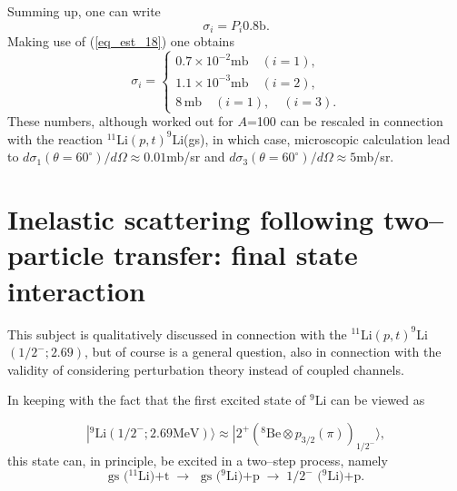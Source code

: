 \documentclass[a4paper,14pt]{article}
\begin{document}
Summing up, one can write
\begin{equation}\label{eq_est_23}
\sigma_i=P_i0.8\text{b}.
\end{equation}
Making use of (\ref{eq_est_18}) one obtains
\begin{equation}\label{eq_est_24}
\sigma_i=\left\{
\begin{array}{l}
  0.7\times 10^{-2} \text{mb}\quad (i=1), \\
   1.1\times 10^{-3} \text{mb}\quad (i=2), \\
    8 \,\text{mb}\quad (i=1),\quad (i=3).
\end{array}
\right.
\end{equation}
These numbers, although worked out for $A$=100 can be rescaled in connection with the reaction $^{11}$Li$(p,t)^9$Li(gs), in which case, microscopic calculation lead to $d\sigma_1(\theta=60^\circ)/d\Omega\approx 0.01$mb/sr and $d\sigma_3(\theta=60^\circ)/d\Omega\approx 5$mb/sr.

\section{Inelastic scattering following two--particle transfer: final state interaction}
This subject is qualitatively discussed in connection with the $^{11}$Li$(p,t)^9$Li$(1/2^-;2.69)$, but of course is a general question, also in connection with the validity of considering perturbation theory instead of coupled channels.



In keeping with the fact that the first excited state of $^9$Li can be viewed as

\begin{equation}\label{eq_est_25}
|^9\text{Li}(1/2^-;2.69 \text{MeV})\rangle\approx|2^+\left(^8\text{Be}\otimes p_{3/2}(\pi)\right)_{1/2^-}\rangle,
\end{equation}
this state can, in principle, be excited in a two--step process, namely
\begin{equation}\label{eq_est_26}
\text{gs ($^{11}$Li)+t$\;\longrightarrow\;$ gs ($^{9}$Li)+p$\;\longrightarrow \;1/2^-$ ($^{9}$Li)+p}.
\end{equation}
\end{document}
